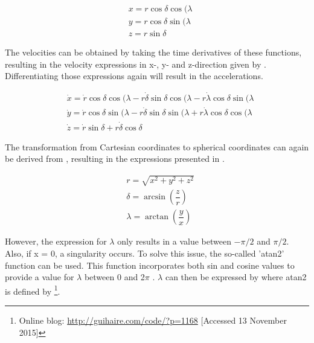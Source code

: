 
\begin{equation} \label{eq:sphertocartp}
\begin{split}
& x=r\cos\delta \cos(\lambda \\
& y=r\cos\delta \sin(\lambda \\
& z=r\sin\delta 
\end{split}
\end{equation}

The velocities can be obtained by taking the time derivatives of these functions, resulting in the velocity expressions in x-, y- and z-direction given by . Differentiating those expressions again will result in the accelerations.

\begin{equation} \label{eq:sphertocartv}
\begin{split}
& \dot{x}=\dot{r}\cos\delta \cos(\lambda -r\dot{\delta}\sin\delta \cos(\lambda -r\dot{\lambda}\cos\delta \sin(\lambda \\
& \dot{y}=\dot{r}\cos\delta \sin(\lambda -r\dot{\delta}\sin\delta \sin(\lambda +r\dot{\lambda}\cos\delta \cos(\lambda \\
& \dot{z}=\dot{r}\sin\delta +r\dot{\delta}\cos\delta 
\end{split}
\end{equation}

The transformation from Cartesian coordinates to spherical coordinates can again be derived from , resulting in the expressions presented in .

\begin{equation} \label{eq:carttospherp}
\begin{split}
& r=\sqrt{x^{2}+y^{2}+z^{2}}\\
& \delta=\arcsin(\dfrac{z}{r})\\
& \lambda=\arctan(\dfrac{y}{x})
\end{split}
\end{equation}

However, the expression for $\lambda$ only results in a value between $-\pi/2$ and $\pi/2$. Also, if x = 0, a singularity occurs. To solve this issue, the so-called 'atan2' function can be used. This function incorporates both sin and cosine values to provide a value for $\lambda$ between 0 and 2$\pi$ \cite{noomen2013basic}. $\lambda$ can then be expressed by  where atan2 is defined by \footnote{Online blog: \url{http://guihaire.com/code/?p=1168} [Accessed 13 November 2015]}.

